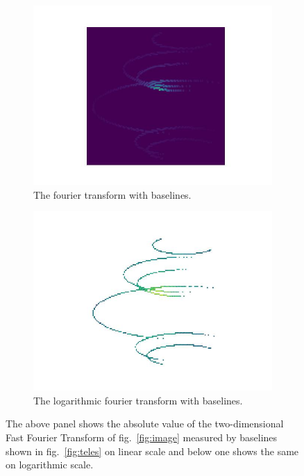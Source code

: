 \begin{figure}
	\centering
	\begin{subfigure}{\linewidth}
		\includegraphics[width=\linewidth]{fig/ft/ft_base.jpg}
		\caption{The fourier transform with baselines.}
	\end{subfigure}\hfill
	\begin{subfigure}{\linewidth}
		\includegraphics[width=\linewidth]{fig/ft/ft_log_base.jpg}
		\caption{The logarithmic fourier transform with baselines.}
	\end{subfigure}
	\caption{The above panel shows the absolute value of the two-dimensional Fast Fourier Transform of fig.~\ref{fig:image} measured by baselines shown in fig.~\ref{fig:teles} on linear scale and below one shows the same on logarithmic scale.}
	\label{fig:ft_base}
\end{figure}
